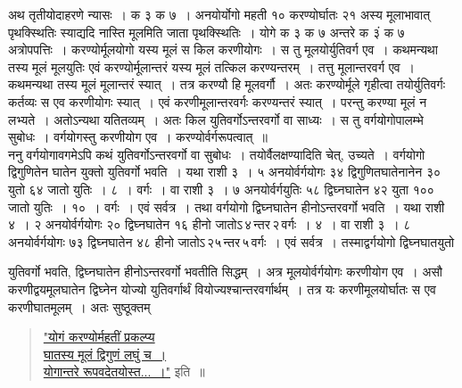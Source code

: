 \documentclass[11pt, openany]{book}
\begin{document}
\vspace{-3mm}
 अथ तृतीयोदाहरणे न्यासः~। क ३ क ७~। अनयोर्योगो महती १० 
करण्योर्घातः २१ अस्य मूलाभावात् पृथक्स्थितिः स्याद्यदि नास्ति मूलमिति 
जाता पृथक्स्थितिः~। योगे क ३ क ७ अन्तरे क ३ं क ७ अत्रोपपत्तिः~। 
करण्योर्मूलयोगो यस्य मूलं स किल करणीयोगः~। स तु मूलयोर्युतिवर्ग 
एव~। कथमन्यथा तस्य मूलं मूलयुतिः एवं करण्योर्मूलान्तरं यस्य मूलं तत्किल
करण्यन्तरम्~। तत्तु मूलान्तरवर्ग एव~। कथमन्यथा तस्य मूलं मूलान्तरं 
स्यात्~। तत्र करण्यौ हि मूलवर्गौ~। अतः करण्योर्मूले गृहीत्वा तयोर्युतिवर्गः कर्तव्यः स एव करणीयोगः स्यात्~। एवं करणीमूलान्तरवर्गः 
करण्यन्तरं स्यात्~। परन्तु करण्या मूलं न लभ्यते~। अतोऽन्यथा यतितव्यम्~। 
अतः किल युतिवर्गोऽन्तरवर्गो वा साध्यः~। स तु वर्गयोगोपालम्भे सुबोधः~। 
वर्गयोगस्तु करणीयोग एव~। करण्योर्वर्गरूपत्वात्~॥ \\

\vspace{-3mm}
 ननु वर्गयोगावगमेऽपि कथं युतिवर्गोऽन्तरवर्गो वा सुबोधः~। तयोर्वैलक्षण्यादिति चेत्, उच्यते~। वर्गयोगो द्विगुणितेन घातेन युक्तो युतिवर्गो भवति~। यथा राशी ३~। ५ अनयोर्वर्गयोगः ३४ द्विगुणितघातेनानेन ३० युतो ६४ जातो युतिः~। ८~। वर्गः~। वा राशी ३~। ७ अनयोर्वर्गयुतिः ५८ द्विघ्नघातेन ४२ युता १०० जातो युतिः~। १०~। वर्गः~। एवं सर्वत्र~। तथा वर्गयोगो द्विघ्नघातेन हीनोऽन्तरवर्गो भवति~। यथा राशी ४~। २ अनयोर्वर्गयोगः २० द्विघ्नघातेन १६ हीनो जातोऽ\textendash \,४\textendash \,न्तर\textendash \,२\textendash \,वर्गः~। ४~। वा राशी ३~। ८ अनयोर्वर्गयोगः ७३ द्विघ्नघातेन ४८ हीनो जातोऽ\textendash \,२५\textendash \,न्तर\textendash \,५\textendash \,वर्गः~। एवं सर्वत्र~। तस्माद्वर्गयोगो द्विघ्नघातयुतो
\newpage

\noindent युतिवर्गो भवति, द्विघ्नघातेन हीनोऽन्तरवर्गो भवतीति सिद्धम्~। अत्र
मूलयोर्वर्गयोगः 
करणीयोग एव~। असौ करणीद्वयमूलघातेन द्विघ्नेन योज्यो युतिवर्गार्थं 
वियोज्यश्चान्तरवर्गार्थम्~। तत्र यः करणीमूलयोर्घातः स एव करणीघातमूलम्~। 
अतः सुष्ठूक्तम्\textendash  
\begin{quote}
    \hyperref[1.12.1]{"योगं करण्योर्महतीं प्रकल्प्य \\
घातस्य मूलं द्विगुणं लघुं च~। \\
योगान्तरे रूपवदेतयोस्त...~।"} इति~॥
\end{quote}
\end{document}
